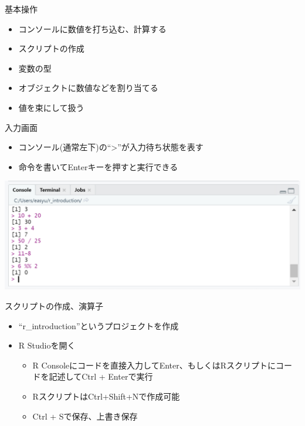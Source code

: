 \documentclass[
  ignorenonframetext,
]{beamer}
\providecommand{\tightlist}{%
  \setlength{\itemsep}{0pt}\setlength{\parskip}{0pt}}
\begin{document}
\begin{frame}[fragile]{基本操作}
\protect\hypertarget{ux57faux672cux64cdux4f5c}{}
\begin{itemize}
\tightlist
\item
  コンソールに数値を打ち込む、計算する
\item
  スクリプトの作成
\item
  変数の型
\item
  オブジェクトに数値などを割り当てる
\item
  値を束にして扱う
\end{itemize}

\begin{block}{入力画面}
\protect\hypertarget{ux5165ux529bux753bux9762}{}
\begin{itemize}
\tightlist
\item
  コンソール(通常左下)の``\textgreater{}''が入力待ち状態を表す
\item
  命令を書いてEnterキーを押すと実行できる
\end{itemize}

\begin{center}\includegraphics[width=0.95\linewidth]{figs/console} \end{center}
\end{block}

\begin{block}{スクリプトの作成、演算子}
\protect\hypertarget{ux30b9ux30afux30eaux30d7ux30c8ux306eux4f5cux6210ux6f14ux7b97ux5b50}{}
\begin{itemize}
\item
  ``r\_introduction''というプロジェクトを作成
\item
  R Studioを開く

  \begin{itemize}
  \tightlist
  \item
    R
    Consoleにコードを直接入力してEnter、もしくはRスクリプトにコードを記述してCtrl
    + Enterで実行
  \item
    RスクリプトはCtrl+Shift+Nで作成可能
  \item
    Ctrl + Sで保存、上書き保存
  \end{itemize}
\end{itemize}


\end{block}
\end{frame}
\end{document}
